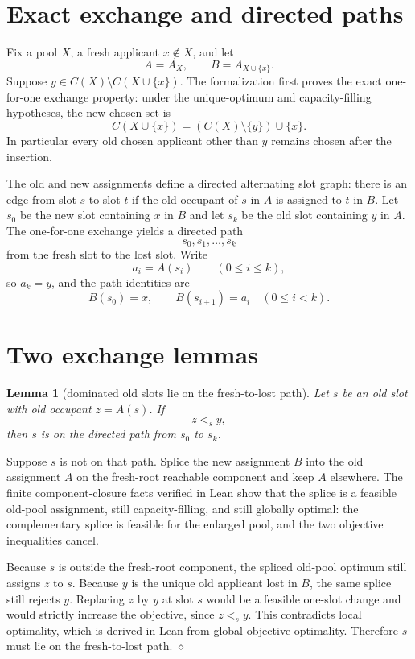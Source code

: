 \documentclass[11pt]{article}
\newtheorem{lemma}{Lemma}
\newenvironment{proof}{\par\noindent{\it Proof. }}{\hfill$\diamond$\par}
\newcommand{\chosen}{C}
\begin{document}
\section*{Exact exchange and directed paths}

Fix a pool $X$, a fresh applicant $x \notin X$, and let
\[
  A = A_X,\qquad B = A_{X\cup\{x\}}.
\]
Suppose $y \in \chosen(X)\setminus \chosen(X\cup\{x\})$.  The formalization first
proves the exact one-for-one exchange property: under the unique-optimum and
capacity-filling hypotheses, the new chosen set is
\[
  \chosen(X\cup\{x\}) = (\chosen(X)\setminus \{y\})\cup\{x\}.
\]
In particular every old chosen applicant other than $y$ remains chosen after
the insertion.

The old and new assignments define a directed alternating slot graph: there is
an edge from slot $s$ to slot $t$ if the old occupant of $s$ in $A$ is assigned
to $t$ in $B$.  Let $s_0$ be the new slot containing $x$ in $B$ and let $s_k$ be
the old slot containing $y$ in $A$.  The one-for-one exchange yields a directed
path
\[
  s_0,s_1,\ldots,s_k
\]
from the fresh slot to the lost slot.  Write
\[
  a_i = A(s_i) \qquad (0\le i\le k),
\]
so $a_k=y$, and the path identities are
\[
  B(s_0)=x,\qquad B(s_{i+1})=a_i \quad (0\le i<k).
\]

\section*{Two exchange lemmas}

\begin{lemma}[dominated old slots lie on the fresh-to-lost path]
Let $s$ be an old slot with old occupant $z=A(s)$.  If
\[
  z <_s y,
\]
then $s$ is on the directed path from $s_0$ to $s_k$.
\end{lemma}

\begin{proof}
Suppose $s$ is not on that path.  Splice the new assignment $B$ into the old
assignment $A$ on the fresh-root reachable component and keep $A$ elsewhere.
The finite component-closure facts verified in Lean show that the splice is a
feasible old-pool assignment, still capacity-filling, and still globally
optimal: the complementary splice is feasible for the enlarged pool, and the
two objective inequalities cancel.

Because $s$ is outside the fresh-root component, the spliced old-pool optimum
still assigns $z$ to $s$.  Because $y$ is the unique old applicant lost in
$B$, the same splice still rejects $y$.  Replacing $z$ by $y$ at slot $s$ would
be a feasible one-slot change and would strictly increase the objective, since
$z<_s y$.  This contradicts local optimality, which is derived in Lean from
global objective optimality.  Therefore $s$ must lie on the fresh-to-lost path.
\end{proof}
\end{document}
